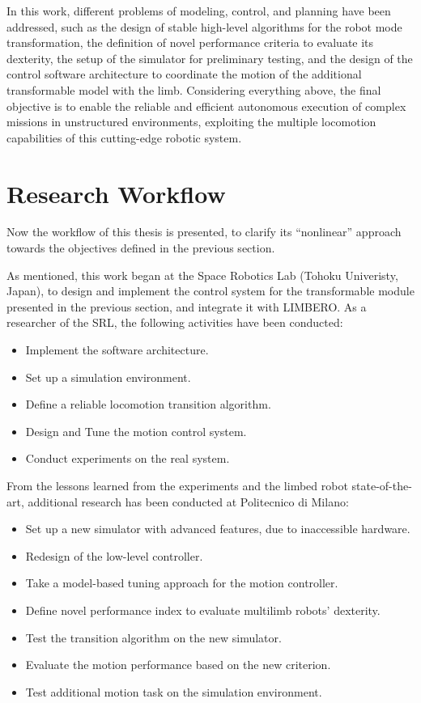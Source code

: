 In this work, different problems of modeling, control, and planning have been addressed, such as the design of stable high-level algorithms for the robot mode transformation, the definition of novel performance criteria to evaluate its dexterity, the setup of the simulator for preliminary testing, and the design of the control software architecture to coordinate the motion of the additional transformable model with the limb.
Considering everything above, the final objective is to enable the reliable and efficient autonomous execution of complex missions in unstructured environments, exploiting the multiple locomotion capabilities of this cutting-edge robotic system.  

 
\section{Research Workflow}
\label{sec:approach}

Now the workflow of this thesis is presented, to clarify its “nonlinear” approach towards the objectives defined in the previous section.

As mentioned, this work began at the Space Robotics Lab (Tohoku Univeristy, Japan), to design and implement the control system for the transformable module presented in the previous section, and integrate it with LIMBERO. As a researcher of the SRL, the following activities have been conducted: 
\begin{itemize}
  \setlength\itemsep{-0.7em} 
    \item Implement the software architecture. 
    \item Set up a simulation environment.
    \item Define a reliable locomotion transition algorithm.
    \item Design and Tune the motion control system. 
    \item Conduct experiments on the real system.
\end{itemize}

From the lessons learned from the experiments and the limbed robot state-of-the-art, additional research has been conducted at Politecnico di Milano:
\begin{itemize}
  \setlength\itemsep{-0.7em} 
    \item Set up a new simulator with advanced features, due to inaccessible hardware.  
    \item Redesign of the low-level controller. 
    \item Take a model-based tuning approach for the motion controller.
    \item Define novel performance index to evaluate multilimb robots' dexterity.
    \item Test the transition algorithm on the new simulator.
    \item Evaluate the motion performance based on the new criterion.
    \item Test additional motion task on the simulation environment.
\end{itemize}





